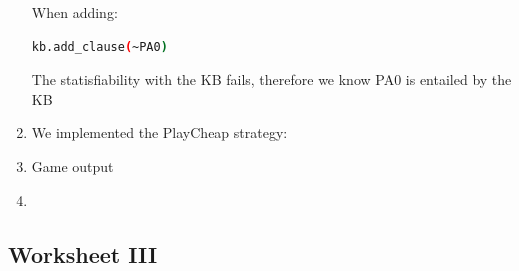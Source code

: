 \documentclass[a4paper,11pt]{article}
\begin{document}
\begin{enumerate}
When adding: 
\begin{lstlisting}[language=bash]
kb.add_clause(~PA0)
\end{lstlisting}
The statisfiability with the KB fails, therefore we know PA0 is entailed by the KB

\item We implemented the PlayCheap strategy:

\item Game output

\item 
\end{enumerate}



\clearpage
\subsection{Worksheet III}
\end{document}
